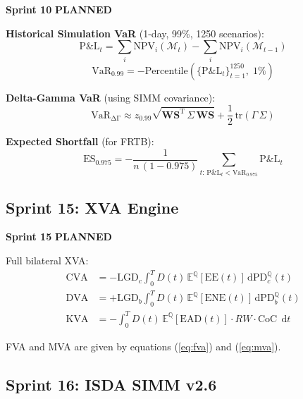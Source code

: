 \documentclass[11pt, a4paper]{article}
\newcommand{\T}{\mathrm{T}}
\newcommand{\sprintstatus}[3]{%
  \begin{tcolorbox}[sprintbox]
  \small
  \textbf{\color{navy}Sprint #1} \quad
  \textbf{\color{#2}#3}
  \end{tcolorbox}\vspace{4pt}
}
\begin{document}
\sprintstatus{10}{amber!80!black}{PLANNED}

\textbf{Historical Simulation VaR} (1-day, 99\%, 1250 scenarios):
\begin{equation}
  \mathrm{P\&L}_t = \sum_i \mathrm{NPV}_i\!\left(\mathcal{M}_t\right)
                  - \sum_i \mathrm{NPV}_i\!\left(\mathcal{M}_{t-1}\right)
\end{equation}
\begin{equation}
  \mathrm{VaR}_{0.99} = -\mathrm{Percentile}\!\left(\{\mathrm{P\&L}_t\}_{t=1}^{1250},\; 1\%\right)
\end{equation}

\textbf{Delta-Gamma VaR} (using SIMM covariance):
\begin{equation}
  \mathrm{VaR}_{\mathrm{\Delta\Gamma}} \approx z_{0.99}\sqrt{\mathbf{WS}^\T\,\Sigma\,\mathbf{WS}}
    + \frac{1}{2}\,\mathrm{tr}(\Gamma\,\Sigma)
\end{equation}

\textbf{Expected Shortfall} (for FRTB):
\begin{equation}
  \mathrm{ES}_{0.975} = -\frac{1}{n\,(1-0.975)}
    \sum_{t:\,\mathrm{P\&L}_t < \mathrm{VaR}_{0.975}} \mathrm{P\&L}_t
\end{equation}

\subsection{Sprint 15: XVA Engine}

\sprintstatus{15}{amber!80!black}{PLANNED}

Full bilateral XVA:
\begin{align}
  \mathrm{CVA} &= -\mathrm{LGD}_c\int_0^T D(t)\,\mathbb{E}^{\mathbb{Q}}[\mathrm{EE}(t)]\,\mathrm{d}\mathrm{PD}_c^{\mathbb{Q}}(t)\\
  \mathrm{DVA} &= +\mathrm{LGD}_b\int_0^T D(t)\,\mathbb{E}^{\mathbb{Q}}[\mathrm{ENE}(t)]\,\mathrm{d}\mathrm{PD}_b^{\mathbb{Q}}(t)\\
  \mathrm{KVA} &= -\int_0^T D(t)\,\mathbb{E}^{\mathbb{Q}}\!\left[\mathrm{EAD}(t)\right]
                  \cdot RW\cdot\mathrm{CoC}\;\,\mathrm{d}t
\end{align}

FVA and MVA are given by equations (\ref{eq:fva}) and (\ref{eq:mva}).

\subsection{Sprint 16: ISDA SIMM v2.6}
\end{document}
